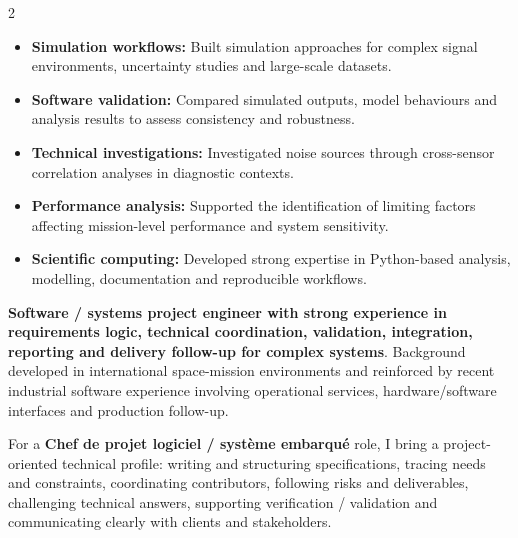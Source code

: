 \documentclass[8pt,a4paper,ragged2e,withhyper]{altacv}
\begin{document}
\begin{paracol}{2}
\begin{itemize}
  \item \textbf{Simulation workflows:} Built simulation approaches for complex signal environments, uncertainty studies and large-scale datasets.
  \item \textbf{Software validation:} Compared simulated outputs, model behaviours and analysis results to assess consistency and robustness.
  \item \textbf{Technical investigations:} Investigated noise sources through cross-sensor correlation analyses in diagnostic contexts.
  \item \textbf{Performance analysis:} Supported the identification of limiting factors affecting mission-level performance and system sensitivity.
  \item \textbf{Scientific computing:} Developed strong expertise in Python-based analysis, modelling, documentation and reproducible workflows.
\end{itemize}



\switchcolumn


\textbf{Software / systems project engineer with strong experience in requirements logic, technical coordination, validation, integration, reporting and delivery follow-up for complex systems}. Background developed in international space-mission environments and reinforced by recent industrial software experience involving operational services, hardware/software interfaces and production follow-up.

For a \textbf{Chef de projet logiciel / système embarqué} role, I bring a project-oriented technical profile: writing and structuring specifications, tracing needs and constraints, coordinating contributors, following risks and deliverables, challenging technical answers, supporting verification / validation and communicating clearly with clients and stakeholders.


\end{paracol}
\end{document}
